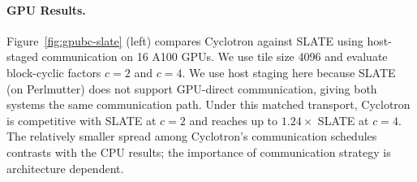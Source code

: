 \documentclass[sigplan, nonacm]{acmart}
\begin{document}


\paragraph{GPU Results.}
Figure~\ref{fig:gpubc-slate} (left) compares Cyclotron against SLATE using host-staged communication on 16 A100 GPUs. We use tile size 4096 and evaluate block-cyclic factors \(c=2\) and \(c=4\). We use host staging here because SLATE (on Perlmutter) does not support GPU-direct communication, giving both systems the same communication path. Under this matched transport, Cyclotron is competitive with SLATE at \(c=2\) and reaches up to \(1.24\times\) SLATE at \(c=4\). The relatively smaller spread among Cyclotron's communication schedules contrasts with the CPU results; the importance of communication strategy is architecture dependent.
\end{document}
